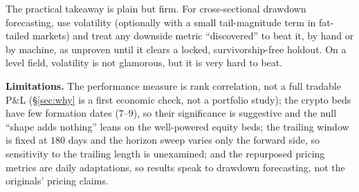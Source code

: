 \documentclass[sigconf,anonymous,nonacm]{acmart}
\begin{document}
The practical takeaway is plain but firm. For cross-sectional drawdown
forecasting, use volatility (optionally with a small tail-magnitude term in
fat-tailed markets) and treat any downside metric ``discovered'' to beat it,
by hand or by machine, as unproven until it clears a locked, survivorship-free
holdout. On a level field, volatility is not glamorous, but it is very hard to beat.

\textbf{Limitations.} The performance measure is rank correlation, not a full tradable P\&L
(\S\ref{sec:why} is a first economic check, not a portfolio study); the
crypto beds have few formation dates ($7$--$9$), so their significance is
suggestive and the null ``shape adds nothing'' leans on the well-powered equity
beds; the trailing window is fixed at $180$ days and the horizon sweep varies only the
forward side, so sensitivity to the trailing length is unexamined; and the repurposed
pricing metrics are daily adaptations, so results speak to
drawdown forecasting, not the originals' pricing claims.



\end{document}
